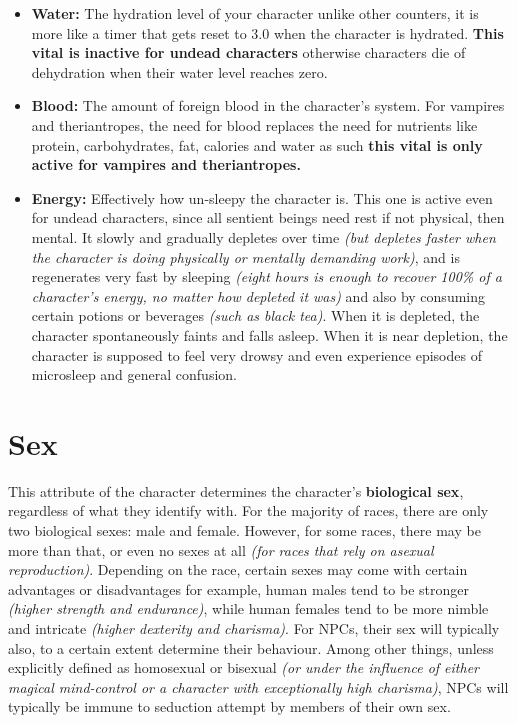 \documentclass[openany,11pt,a4paper]{book}
\begin{document}
\begin{itemize}
\item \textbf{Water:} The hydration level of your character \textemdash unlike other counters, it is more like a timer that gets reset to 3.0 when the character is hydrated. \textbf{This vital is inactive for undead characters} \textemdash otherwise characters die of dehydration when their water level reaches zero.
\item \textbf{Blood:} The amount of foreign blood in the character's system. For vampires and theriantropes, the need for blood replaces the need for nutrients like protein, carbohydrates, fat, calories and water \textemdash as such \textbf{this vital is only active for vampires and theriantropes.}
\item \textbf{Energy:} Effectively how un-sleepy the character is. This one is active even for undead characters, since all sentient beings need rest \textemdash if not physical, then mental. It slowly and gradually depletes over time \textit{(but depletes faster when the character is doing physically or mentally demanding work)}, and is regenerates very fast by sleeping \textit{(eight hours is enough to recover 100\% of a character's energy, no matter how depleted it was)} and also by consuming certain potions or beverages  \textit{(such as black tea)}. When it is depleted, the character spontaneously faints and falls asleep. When it is near depletion, the character is supposed to feel very drowsy and even experience episodes of microsleep and general confusion.
\end{itemize}
\section{Sex}
This attribute of the character determines the character's \textbf{biological sex}, regardless of what they identify with. For the majority of races, there are only two biological sexes: male and female. However, for some races, there may be more than that, or even no sexes at all \textit{(for races that rely on asexual reproduction)}.\newline
Depending on the race, certain sexes may come with certain advantages or disadvantages \textemdash for example, human males tend to be stronger \textit{(higher strength and endurance)}, while human females tend to be more nimble and intricate \textit{(higher dexterity and charisma)}.
For NPCs, their sex will typically also, to a certain extent determine their behaviour. Among other things, unless explicitly defined as homosexual or bisexual \textit{(or under the influence of either magical mind-control or a character with exceptionally high charisma)}, NPCs will typically be immune to seduction attempt by members of their own sex.
\end{document}
